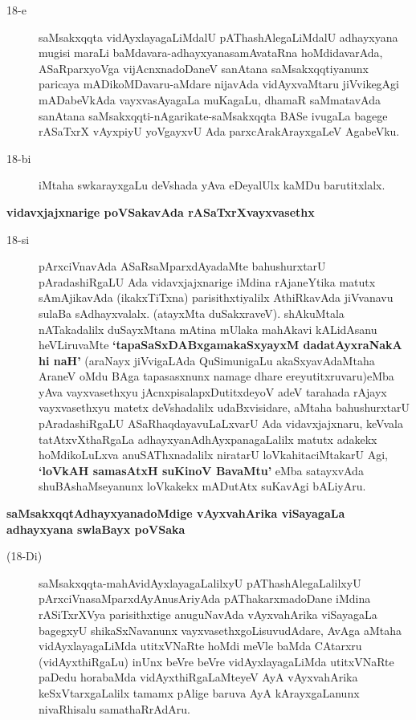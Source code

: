 \begin{description}
\item[18-e] saMsakxqqta vidAyxlayagaLiMdalU pAThashAlegaLiMdalU adhayxyana mugisi maraLi baMdavara-adhayx\-yana\-samAvataRna hoMdidavarAda, ASaR\break\-parxyoVga vijAcnxnadoDaneV sanAtana saMsakxqqti\-yanunx paricaya mADi\-koMDa\-varu-aMdare nijavAda vidAyxvaMtaru jiVvikegAgi mADabeVkAda vayxva\break\-sAyagaLa muKagaLu, dhamaR saMmatavAda sanAtana saMsakxqqti-nAgarikate\break-saMsakxqqta BASe ivu\-gaLa bagege rASaTxrX vAyxpiyU yoVgayxvU Ada parxcAra\-kArayxgaLeV AgabeVku.

\item[18-bi] iMtaha swkarayxgaLu deVshada yAva eDeyalUlx kaMDu barutitxlalx.
\end{description}
\noindent
{\large\bf vidavxjajxnarige poVSakavAda rASaTxrXvayxvasethx}\label{page46}
\begin{description}
\item[18-si] pArxciVnavAda ASaRsaMparxdAyadaMte bahushurxtarU pAradashiRgaLU Ada vidavxjajxnarige iMdina\- rAjaneYtika matutx sAmAjikavAda (ikakxTiTxna) parisithxti\-yalilx AthiRkavAda jiVvanavu sulaBa sAdhayx\-valalx. (atayxMta duSakxraveV). shAkuMtala nATakadalilx duSayxMtana mAtina mUlaka mahAkavi kALi\-dAsanu heVLiruvaMte {\bf `tapaSaSxDABxgamakaSxyayxM\label{46} dadatAyxraNakA hi naH'} (araNayx jiVvi\-gaLAda QuSi\-muni\-gaLu akaSxyavAdaMtaha AraneV oMdu BAga tapasasxnunx namage dhare ereyutitxruvaru)eMba yAva vayxvasethxyu jAcnxpisalapxDutitxdeyoV adeV tarahada rAjayx vayxvasethxyu matetx deVshadalilx udaBxvisidare, aMtaha bahushurxtarU pAradashiRgaLU ASaRhaqdayavuLaLxvarU Ada vidavxjajxnaru, keVvala tatAtxvX\-thaRgaLa adhayxyanAdhAyxpanagaLalilx matutx adakekx hoMdikoLuLxva anuSAThxnadalilx niratarU loVkahita\-ciMtakarU Agi, {\bf `loVkAH samasAtxH suKinoV BavaMtu'\label{47}} eMba satayxvAda shuBAshaMseyanunx loVkakekx mADutAtx suKavAgi bALiyAru.
\end{description}
{\noindent
{\large\bf saMsakxqqtAdhayxyanadoMdige vAyxvahArika viSayagaLa adhayxyana swlaBayx poVSaka}}\label{page47}
\begin{description}
\item[(18-Di)] saMsakxqqta-mahAvidAyxlayagaLalilxyU pAThashAlegaLalilxyU pArxciVna\break saMparxdAyAnu\-sAri\-yAda pAThakarxmadoDane iMdina rASiTxrXVya pari\-sithxtige anuguNavAda vAyxvahArika viSayagaLa bagegxyU shikaSxNavanunx vayxvasethxgoLisuvudAdare, AvAga aMtaha vidAyxlayagaLiMda utitxVNaRte hoMdi meVle baMda CAtarxru (vidAyxthiRgaLu) inUnx beVre beVre vidAyxlayagaLiMda utitxVNaRte paDedu hora\-baMda vidAyxthiRgaLaMteyeV AyA vAyxvahArika keSxVtarxgaLalilx tamamx pAlige baruva AyA kArayxgaLanunx nivaR\-hisalu samathaRrAdAru.
\end{description}
